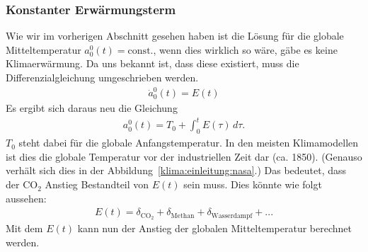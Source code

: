 \begin{refsection}
\subsubsection{Konstanter Erwärmungsterm
\label{klima:subsubsection:erwaermungsterm}}
%
Wie wir im vorherigen Abschnitt gesehen haben ist die Lösung für
die globale Mitteltemperatur $a^0_0(t)=\text{const.}$, wenn dies
wirklich so wäre, gäbe es keine Klimaerwärmung. Da uns bekannt ist,
dass diese existiert, muss die Differenzialgleichung umgeschrieben
werden.
\begin{align}
\dot a^0_0(t)=E(t)
\end{align}
Es ergibt sich daraus neu die Gleichung
\begin{align}
a^0_0(t)=T_0 + \int_0^t E(\tau)\,d\tau.
\end{align}
$T_0$ steht dabei für die globale Anfangstemperatur. In den meisten
Klimamodellen ist dies die globale Temperatur vor der industriellen
Zeit dar (ca. 1850). (Genauso verhält sich dies in der
Abbildung~\ref{klima:einleitung:nasa}.) Das bedeutet, dass der
CO$_2$ Anstieg Bestandteil von $E(t)$ sein muss. Dies könnte wie
folgt aussehen:
\begin{align}
E(t)=\delta_{\text{CO}_2}+\delta_{\text{Methan}}+\delta_{\text{Wasserdampf}}+...
\end{align}
Mit dem $E(t)$ kann nun der Anstieg der globalen Mitteltemperatur berechnet werden.


\end{refsection}
